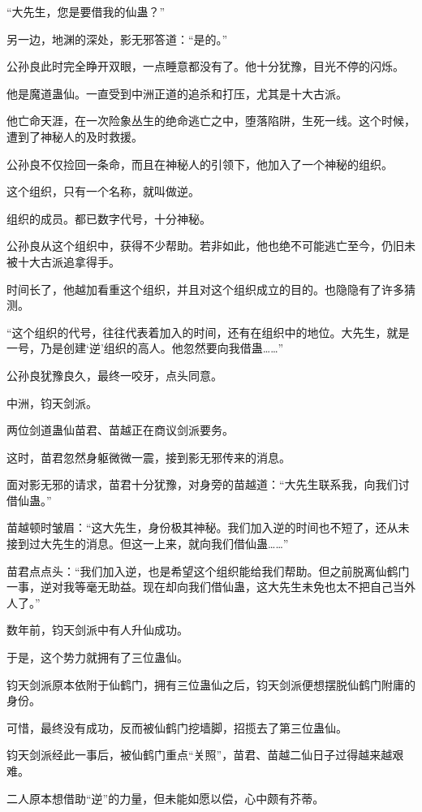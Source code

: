 \begin{this_body}
“大先生，您是要借我的仙蛊？”

另一边，地渊的深处，影无邪答道：“是的。”

公孙良此时完全睁开双眼，一点睡意都没有了。他十分犹豫，目光不停的闪烁。

他是魔道蛊仙。一直受到中洲正道的追杀和打压，尤其是十大古派。

他亡命天涯，在一次险象丛生的绝命逃亡之中，堕落陷阱，生死一线。这个时候，遭到了神秘人的及时救援。

公孙良不仅捡回一条命，而且在神秘人的引领下，他加入了一个神秘的组织。

这个组织，只有一个名称，就叫做逆。

组织的成员。都已数字代号，十分神秘。

公孙良从这个组织中，获得不少帮助。若非如此，他也绝不可能逃亡至今，仍旧未被十大古派追拿得手。

时间长了，他越加看重这个组织，并且对这个组织成立的目的。也隐隐有了许多猜测。

“这个组织的代号，往往代表着加入的时间，还有在组织中的地位。大先生，就是一号，乃是创建‘逆’组织的高人。他忽然要向我借蛊……”

公孙良犹豫良久，最终一咬牙，点头同意。

中洲，钧天剑派。

两位剑道蛊仙苗君、苗越正在商议剑派要务。

这时，苗君忽然身躯微微一震，接到影无邪传来的消息。

面对影无邪的请求，苗君十分犹豫，对身旁的苗越道：“大先生联系我，向我们讨借仙蛊。”

苗越顿时皱眉：“这大先生，身份极其神秘。我们加入逆的时间也不短了，还从未接到过大先生的消息。但这一上来，就向我们借仙蛊……”

苗君点点头：“我们加入逆，也是希望这个组织能给我们帮助。但之前脱离仙鹤门一事，逆对我等毫无助益。现在却向我们借仙蛊，这大先生未免也太不把自己当外人了。”

数年前，钧天剑派中有人升仙成功。

于是，这个势力就拥有了三位蛊仙。

钧天剑派原本依附于仙鹤门，拥有三位蛊仙之后，钧天剑派便想摆脱仙鹤门附庸的身份。

可惜，最终没有成功，反而被仙鹤门挖墙脚，招揽去了第三位蛊仙。

钧天剑派经此一事后，被仙鹤门重点“关照”，苗君、苗越二仙日子过得越来越艰难。

二人原本想借助“逆”的力量，但未能如愿以偿，心中颇有芥蒂。


\end{this_body}
